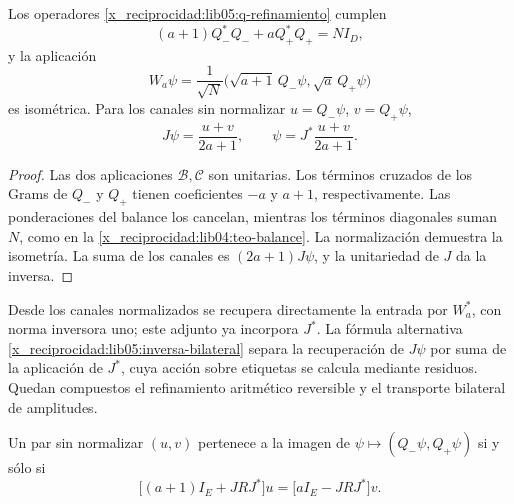 \begin{proposition}
\label{x_reciprocidad:lib05:prop-bilateral}
Los operadores \eqref{x_reciprocidad:lib05:q-refinamiento} cumplen
\begin{equation}
 (a+1)Q_-^*Q_-+aQ_+^*Q_+=NI_D,
 \label{x_reciprocidad:lib05:balance}
\end{equation}
y la aplicación
\begin{equation}
 W_a\psi=\frac1{\sqrt N}
    \bigl(\sqrt{a+1}\,Q_-\psi,\sqrt a\,Q_+\psi\bigr)
 \label{x_reciprocidad:lib05:w}
\end{equation}
es isométrica. Para los canales sin normalizar
\(u=Q_-\psi\), \(v=Q_+\psi\),
\begin{equation}
 J\psi=\frac{u+v}{2a+1},\qquad
 \psi=J^*\frac{u+v}{2a+1}.
 \label{x_reciprocidad:lib05:inversa-bilateral}
\end{equation}
\end{proposition}

\begin{proof}
Las dos aplicaciones \(\mathcal B,\mathcal C\) son unitarias.
Los términos cruzados de los Grams de \(Q_-\) y \(Q_+\) tienen
coeficientes \(-a\) y \(a+1\), respectivamente. Las ponderaciones
del balance los cancelan, mientras los términos diagonales suman
\(N\), como en la \cref{x_reciprocidad:lib04:teo-balance}. La normalización
demuestra la isometría. La suma de los canales es
\((2a+1)J\psi\), y la unitariedad de \(J\) da la inversa.
\end{proof}

Desde los canales normalizados se recupera directamente la entrada
por \(W_a^*\), con norma inversora uno; este adjunto ya incorpora
\(J^*\). La fórmula alternativa
\eqref{x_reciprocidad:lib05:inversa-bilateral} separa la recuperación de \(J\psi\)
por suma de la aplicación de \(J^*\), cuya acción sobre etiquetas
se calcula mediante residuos. Quedan compuestos el refinamiento
aritmético reversible y el transporte bilateral de amplitudes.

\begin{proposition}
\label{x_reciprocidad:lib05:prop-compatibilidad}
Un par sin normalizar \((u,v)\) pertenece a la imagen de
\(\psi\mapsto(Q_-\psi,Q_+\psi)\) si y sólo si
\begin{equation}
 \bigl[(a+1)I_E+JRJ^*\bigr]u
 =\bigl[aI_E-JRJ^*\bigr]v.
 \label{x_reciprocidad:lib05:compatibilidad}
\end{equation}
\end{proposition}

